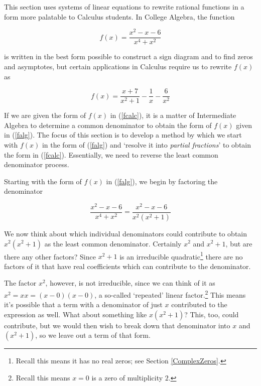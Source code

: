 \documentclass{ximera}
\begin{document}
	\author{Stitz-Zeager}




\setcounter{footnote}{0}

\label{ParFrac}

\setlength{\extrarowheight}{0pt}

This section uses systems of linear equations to rewrite rational functions in a form more palatable to Calculus students. In College Algebra, the function 

\begin{equation} \label{falg} f(x) = \dfrac{x^2-x-6}{x^4+x^2} \tag{1} \end{equation}

is written in the best form possible to construct a sign diagram and to find zeros and asymptotes, but certain applications in Calculus require us to rewrite $f(x)$ as 

\begin{equation} \label{fcalc} f(x) = \dfrac{x+7}{x^2+1} - \dfrac{1}{x} - \dfrac{6}{x^2}  \tag{2} \end{equation}

If we are given the form of $f(x)$ in (\ref{fcalc}), it is a matter of Intermediate Algebra to determine a common denominator to obtain the form of $f(x)$ given in (\ref{falg}).  The focus of this section is to develop a method by which we start with $f(x)$ in the form of (\ref{falg}) and `resolve it into  \textit{partial fractions}' to obtain the form in (\ref{fcalc}).  Essentially, we need to reverse the least common denominator process.  

Starting with the form of $f(x)$ in (\ref{falg}), we begin by factoring the denominator

\[ \dfrac{x^2-x-6}{x^4+x^2} =  \dfrac{x^2-x-6}{x^2 \left(x^2+1\right)} \]

We now think about which individual denominators could contribute to obtain  $x^2 \left(x^2+1\right)$ as the least common denominator.  Certainly $x^2$ and $x^2+1$, but are there any other factors?  Since $x^2+1$ is an irreducible quadratic\footnote{Recall this means it has no real zeros;  see Section \ref{ComplexZeros}.} there are no factors of it that have real coefficients which can contribute to the denominator.  

The factor $x^2$, however, is not irreducible, since we can think of it as $x^2 = xx = (x-0)(x-0)$, a so-called `repeated' linear factor.\footnote{Recall this means $x=0$ is a zero of multiplicity $2$.}   This means it's possible that a term with a denominator of just $x$ contributed to the expression as well.  What about something like $x \left(x^2+1\right)$?  This, too, could contribute, but we would then wish to break down that denominator into $x$ and $\left(x^2+1\right)$, so we leave out a term of that form.  
\end{document}
